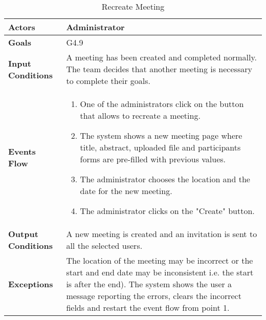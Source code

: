 \begin{table}[H]
	\centering
	\def\arraystretch{1.5}
	\begin{tabular}{|p{7cm}|p{7cm}|}
		\hline
		\textbf{Actors}            & Administrator    \\ \hline
		\textbf{Goals}             & G4.9           \\ \hline
		\textbf{Input Conditions}  & A meeting has been created and completed normally. The team decides that another meeting is necessary to complete their goals. \\ \hline
		\textbf{Events Flow}       & 
		\begin{enumerate}[topsep=0pt, leftmargin=*]
			\item One of the administrators click on the button that allows to recreate a meeting.
			\item The system shows a new meeting page where title, abstract, uploaded file and participants forms are pre-filled with previous values.
			\item The administrator chooses the location and the date for the new meeting.
			\item The administrator clicks on the "Create" button.
		\end{enumerate}              \\ \hline
		\textbf{Output Conditions} & A new meeting is created and an invitation is sent to all the selected users.           \\ \hline
		\textbf{Exceptions}        & The location of the meeting may be incorrect or the start and end date may be inconsistent i.e. the start is after the end). The system shows the user a message reporting the errors,
		clears the incorrect fields and restart the event
		flow from point 1.           \\ \hline
	\end{tabular}
	\caption{Recreate Meeting}
\end{table}

